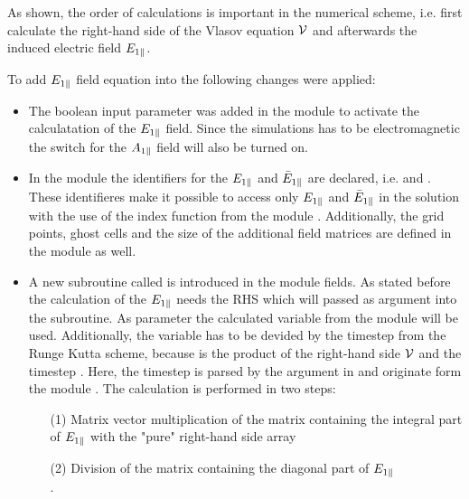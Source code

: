 As shown, the order of calculations is important in the numerical scheme, i.e. first calculate the right-hand side of the Vlasov equation $\mathcal{V}$ and afterwards the induced electric field $E_{1\parallel}$. 

\newpage

To add $E_{1\parallel}$ field equation into {\gkw} the following changes were applied:
\begin{itemize}
    \item The boolean input parameter  was added in the  module to activate the calculatation of the $E_{1\parallel}$ field. Since the simulations has to be electromagnetic the switch for the $A_{1\parallel}$ field will also be turned on.
    \item In the module  the identifiers for the $E_{1\parallel}$ and $\bar{E}_{1\parallel}$ are declared, i.e.  and . These identifieres make it possible to access only $E_{1\parallel}$ and $\bar{E}_{1\parallel}$ in the solution  with the use of the index function from the module . Additionally, the grid points, ghost cells and the size of the additional field matrices are defined in the module  as well.
    \item A new subroutine called  is introduced in the module fields. As stated before the calculation of the $E_{1\parallel}$ needs the RHS which will passed as argument into the subroutine. As parameter the calculated variable  from the module  will be used. Additionally, the variable  has to be devided by the timestep  from the Runge Kutta scheme, because  is the product of the right-hand side $\mathcal{V}$ and the timestep . Here, the timestep  is parsed by the argument  in  and originate form the module . The calculation is performed in two steps:
    \begin{enumerate}
        \item [(1)] Matrix vector multiplication of the matrix containing the integral part of $E_{1\parallel}$ with the "pure" right-hand side array  \\
        \item [(2)] Division of the matrix containing the diagonal part of $E_{1\parallel}$ \\
                    .
    \end{enumerate}

\end{itemize}
